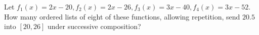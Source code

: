 Let $f_1(x)=2x-20,f_2(x)=2x-26,f_3(x)=3x-40,f_4(x)=3x-52$. How many ordered lists of eight of these functions, allowing repetition, send $20.5$ into $[20,26]$ under successive composition?
